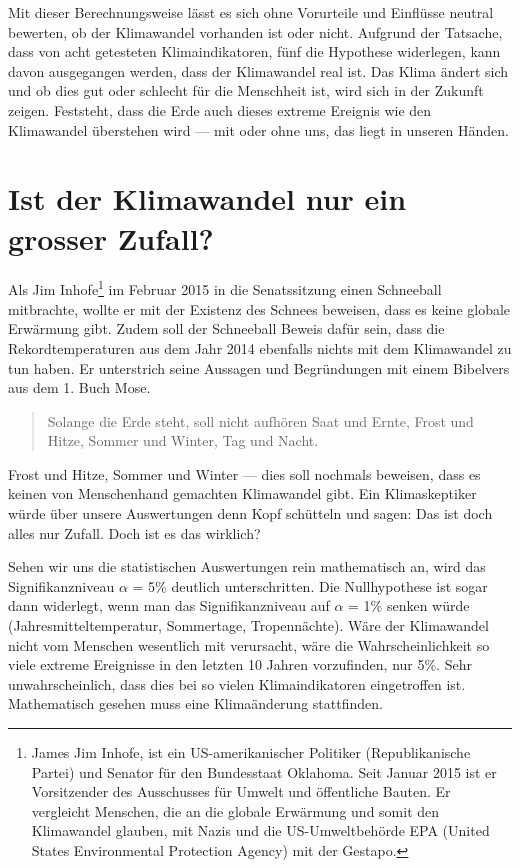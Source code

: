 \begin{refsection}
Mit dieser Berechnungsweise lässt es sich ohne Vorurteile und Einflüsse neutral bewerten, ob der Klimawandel vorhanden ist oder nicht. Aufgrund der Tatsache, dass von acht getesteten Klimaindikatoren, fünf die Hypothese widerlegen, kann davon ausgegangen werden, dass der Klimawandel real ist. Das Klima ändert sich und ob dies gut oder schlecht für die Menschheit ist, wird sich in der Zukunft zeigen. Feststeht, dass die Erde auch dieses extreme Ereignis wie den Klimawandel überstehen wird --- mit oder ohne uns, das liegt in unseren Händen.


\section{Ist der Klimawandel nur ein grosser Zufall?}
Als Jim Inhofe\footnote{%
%
James \glqq Jim\grqq{} Inhofe, ist ein US-amerikanischer Politiker (Republikanische Partei) und Senator für den Bundesstaat Oklahoma. Seit Januar 2015 ist er Vorsitzender des Ausschusses für Umwelt und öffentliche Bauten. Er vergleicht Menschen, die an die globale Erwärmung und somit den Klimawandel glauben, mit Nazis und die US-Umweltbehörde EPA (United States Environmental Protection Agency) mit der Gestapo.} im Februar 2015 in die Senatssitzung einen Schneeball mitbrachte, wollte er mit der Existenz des Schnees beweisen, dass es keine globale Erwärmung gibt. Zudem soll der Schneeball Beweis dafür sein, dass die Rekordtemperaturen aus dem Jahr 2014 ebenfalls nichts mit dem Klimawandel zu tun haben. Er unterstrich seine Aussagen und Begründungen mit einem Bibelvers aus dem 1. Buch Mose.

\begin{quote} 
Solange die Erde steht, soll nicht aufhören Saat und Ernte, Frost und Hitze, Sommer und Winter, Tag und Nacht.
\end{quote}

Frost und Hitze, Sommer und Winter --- dies soll nochmals beweisen, dass es keinen von Menschenhand gemachten Klimawandel gibt.
Ein Klimaskeptiker würde über unsere  Auswertungen denn Kopf schütteln und sagen: Das ist doch alles nur Zufall. Doch ist es das wirklich?

Sehen wir uns die statistischen Auswertungen rein mathematisch an, wird das Signifikanzniveau $\alpha$ = 5\% deutlich unterschritten. Die Nullhypothese ist sogar dann widerlegt, wenn man das Signifikanzniveau auf $\alpha$ = 1\% senken würde (Jahresmitteltemperatur, Sommertage, Tropennächte). Wäre der Klimawandel nicht vom Menschen wesentlich mit verursacht, wäre die Wahrscheinlichkeit so viele extreme Ereignisse in den letzten 10 Jahren vorzufinden, nur 5\%. Sehr unwahrscheinlich, dass dies bei so vielen Klimaindikatoren eingetroffen ist. Mathematisch gesehen muss eine Klimaänderung stattfinden.


\end{refsection}
